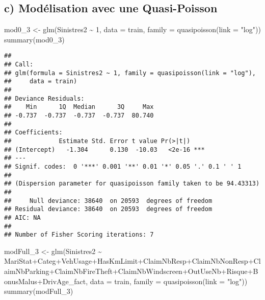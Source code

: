 \documentclass[
]{article}
\newenvironment{Shaded}{\begin{snugshade}}{\end{snugshade}}
\newcommand{\AttributeTok}[1]{\textcolor[rgb]{0.77,0.63,0.00}{#1}}
\newcommand{\DecValTok}[1]{\textcolor[rgb]{0.00,0.00,0.81}{#1}}
\newcommand{\FunctionTok}[1]{\textcolor[rgb]{0.00,0.00,0.00}{#1}}
\newcommand{\NormalTok}[1]{#1}
\newcommand{\OtherTok}[1]{\textcolor[rgb]{0.56,0.35,0.01}{#1}}
\newcommand{\SpecialCharTok}[1]{\textcolor[rgb]{0.00,0.00,0.00}{#1}}
\newcommand{\StringTok}[1]{\textcolor[rgb]{0.31,0.60,0.02}{#1}}
\begin{document}
\hypertarget{c-moduxe9lisation-avec-une-quasi-poisson}{%
\subsection{c) Modélisation avec une
Quasi-Poisson}\label{c-moduxe9lisation-avec-une-quasi-poisson}}

\begin{Shaded}
\begin{Highlighting}[]
\NormalTok{mod0\_3 }\OtherTok{\textless{}{-}} \FunctionTok{glm}\NormalTok{(Sinistres2 }\SpecialCharTok{\textasciitilde{}} \DecValTok{1}\NormalTok{, }\AttributeTok{data =}\NormalTok{ train, }\AttributeTok{family =} \FunctionTok{quasipoisson}\NormalTok{(}\AttributeTok{link =} \StringTok{"log"}\NormalTok{))}
\FunctionTok{summary}\NormalTok{(mod0\_3)}
\end{Highlighting}
\end{Shaded}

\begin{verbatim}
## 
## Call:
## glm(formula = Sinistres2 ~ 1, family = quasipoisson(link = "log"), 
##     data = train)
## 
## Deviance Residuals: 
##    Min      1Q  Median      3Q     Max  
## -0.737  -0.737  -0.737  -0.737  80.740  
## 
## Coefficients:
##             Estimate Std. Error t value Pr(>|t|)    
## (Intercept)   -1.304      0.130  -10.03   <2e-16 ***
## ---
## Signif. codes:  0 '***' 0.001 '**' 0.01 '*' 0.05 '.' 0.1 ' ' 1
## 
## (Dispersion parameter for quasipoisson family taken to be 94.43313)
## 
##     Null deviance: 38640  on 20593  degrees of freedom
## Residual deviance: 38640  on 20593  degrees of freedom
## AIC: NA
## 
## Number of Fisher Scoring iterations: 7
\end{verbatim}

\begin{Shaded}
\begin{Highlighting}[]
\NormalTok{modFull\_3 }\OtherTok{\textless{}{-}} \FunctionTok{glm}\NormalTok{(Sinistres2 }\SpecialCharTok{\textasciitilde{}}\NormalTok{ MariStat}\SpecialCharTok{+}\NormalTok{Categ}\SpecialCharTok{+}\NormalTok{VehUsage}\SpecialCharTok{+}\NormalTok{HasKmLimit}\SpecialCharTok{+}\NormalTok{ClaimNbResp}\SpecialCharTok{+}\NormalTok{ClaimNbNonResp}\SpecialCharTok{+}\NormalTok{ClaimNbParking}\SpecialCharTok{+}\NormalTok{ClaimNbFireTheft}\SpecialCharTok{+}\NormalTok{ClaimNbWindscreen}\SpecialCharTok{+}\NormalTok{OutUseNb}\SpecialCharTok{+}\NormalTok{Risque}\SpecialCharTok{+}\NormalTok{BonusMalus}\SpecialCharTok{+}\NormalTok{DrivAge\_fact, }\AttributeTok{data =}\NormalTok{ train, }\AttributeTok{family =} \FunctionTok{quasipoisson}\NormalTok{(}\AttributeTok{link =} \StringTok{"log"}\NormalTok{))}
\FunctionTok{summary}\NormalTok{(modFull\_3)}
\end{Highlighting}
\end{Shaded}
\end{document}
